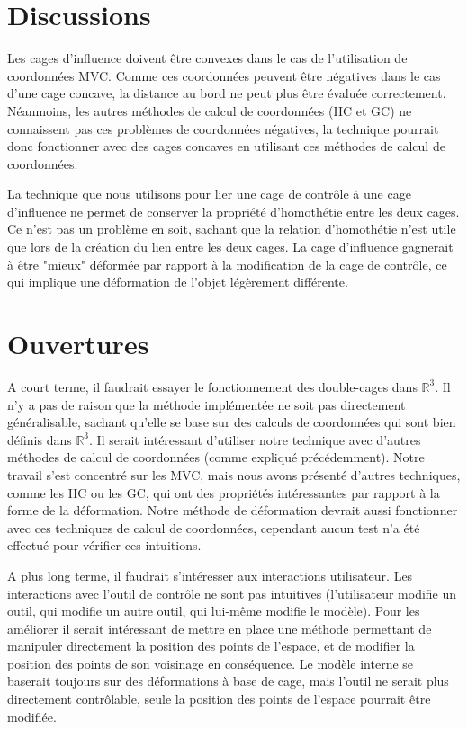 \section{Discussions}

Les cages d'influence doivent être convexes dans le cas de l'utilisation de
coordonnées MVC. Comme ces coordonnées peuvent être négatives dans le cas
d'une cage concave, la distance au bord ne peut plus être évaluée
correctement. Néanmoins, les autres méthodes de calcul de coordonnées (HC et
GC) ne connaissent pas ces problèmes de coordonnées négatives, la technique
pourrait donc fonctionner avec des cages concaves en utilisant ces méthodes de
calcul de coordonnées.

La technique que nous utilisons pour lier une cage de contrôle à une cage
d'influence ne permet de conserver la propriété d'homothétie entre les deux
cages. Ce n'est pas un problème en soit, sachant que la relation d'homothétie
n'est utile que lors de la création du lien entre les deux cages. La cage
d'influence gagnerait à être "mieux" déformée par rapport à la modification de
la cage de contrôle, ce qui implique une déformation de l'objet légèrement
différente.

\section{Ouvertures}

A court terme, il faudrait essayer le fonctionnement des double-cages dans
$\mathbb{R}^3$. Il n'y a pas de raison que la méthode implémentée ne soit pas
directement généralisable, sachant qu'elle se base sur des calculs de
coordonnées qui sont bien définis dans $\mathbb{R}^3$. Il serait intéressant
d'utiliser notre technique avec d'autres méthodes de calcul de coordonnées
(comme expliqué précédemment). Notre travail s'est concentré sur les MVC, mais
nous avons présenté d'autres techniques, comme les HC ou les GC, qui ont des
propriétés intéressantes par rapport à la forme de la déformation. Notre
méthode de déformation devrait aussi fonctionner avec ces techniques de calcul
de coordonnées, cependant aucun test n'a été effectué pour vérifier ces
intuitions.

A plus long terme, il faudrait s'intéresser aux interactions utilisateur. Les
interactions avec l'outil de contrôle ne sont pas intuitives (l'utilisateur
modifie un outil, qui modifie un autre outil, qui lui-même modifie le modèle).
Pour les améliorer il serait intéressant de mettre en place une méthode
permettant de manipuler directement la position des points de l'espace, et de
modifier la position des points de son voisinage en conséquence. Le modèle
interne se baserait toujours sur des déformations à base de cage, mais l'outil
ne serait plus directement contrôlable, seule la position des points de
l'espace pourrait être modifiée.

